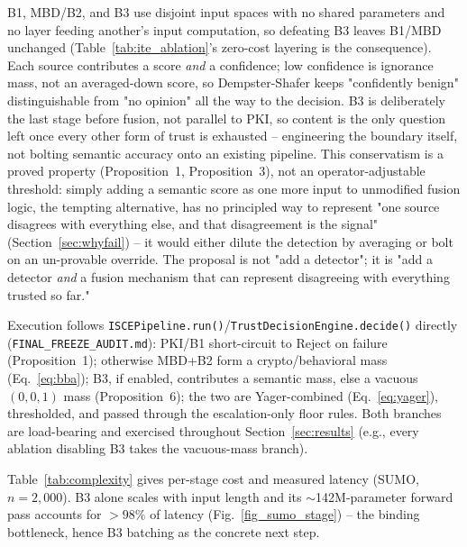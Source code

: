 \documentclass[conference]{IEEEtran}
\begin{document}
B1, MBD/B2, and B3 use disjoint input spaces with no shared parameters and no layer feeding another's input computation, so defeating B3 leaves B1/MBD unchanged (Table~\ref{tab:ite_ablation}'s zero-cost layering is the consequence). Each source contributes a score \emph{and} a confidence; low confidence is ignorance mass, not an averaged-down score, so Dempster-Shafer keeps "confidently benign" distinguishable from "no opinion" all the way to the decision. B3 is deliberately the last stage before fusion, not parallel to PKI, so content is the only question left once every other form of trust is exhausted -- engineering the boundary itself, not bolting semantic accuracy onto an existing pipeline. This conservatism is a proved property (Proposition~1, Proposition~3), not an operator-adjustable threshold: simply adding a semantic score as one more input to unmodified fusion logic, the tempting alternative, has no principled way to represent "one source disagrees with everything else, and that disagreement is the signal" (Section~\ref{sec:whyfail}) -- it would either dilute the detection by averaging or bolt on an un-provable override. The proposal is not "add a detector"; it is "add a detector \emph{and} a fusion mechanism that can represent disagreeing with everything trusted so far."


Execution follows \texttt{ISCEPipeline.run()}/\texttt{TrustDecisionEngine.decide()} directly (\texttt{FINAL\_FREEZE\_AUDIT.md}): PKI/B1 short-circuit to Reject on failure (Proposition~1); otherwise MBD+B2 form a crypto/behavioral mass (Eq.~\eqref{eq:bba}); B3, if enabled, contributes a semantic mass, else a vacuous $(0,0,1)$ mass (Proposition~6); the two are Yager-combined (Eq.~\eqref{eq:yager}), thresholded, and passed through the escalation-only floor rules. Both branches are load-bearing and exercised throughout Section~\ref{sec:results} (e.g., every ablation disabling B3 takes the vacuous-mass branch).

Table~\ref{tab:complexity} gives per-stage cost and measured latency (SUMO, $n{=}2{,}000$). B3 alone scales with input length and its $\sim$142M-parameter forward pass accounts for $>98\%$ of latency (Fig.~\ref{fig_sumo_stage}) -- the binding bottleneck, hence B3 batching as the concrete next step.
\end{document}
